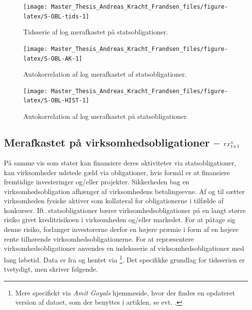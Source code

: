 \documentclass[
  a4paper,
  oneside]{memoir}
\begin{document}
\begin{figure}[htbp!]

{\centering \texttt{[image: Master\_Thesis\_Andreas\_Kracht\_Frandsen\_files/figure-latex/S-OBL-tids-1]} 

}

\caption{Tidsserie af log merafkastet på statsobligationer.}\label{fig:S-OBL-tids}
\end{figure}

\begin{figure}[htbp!]

{\centering \texttt{[image: Master\_Thesis\_Andreas\_Kracht\_Frandsen\_files/figure-latex/S-OBL-AK-1]} 

}

\caption{Autokorrelation af log merafkastet af statsobligationer.}\label{fig:S-OBL-AK}
\end{figure}

\begin{figure}[htbp!]

{\centering \texttt{[image: Master\_Thesis\_Andreas\_Kracht\_Frandsen\_files/figure-latex/S-OBL-HIST-1]} 

}

\caption{Autokorrelation af log merafkastet på statsobligationer.}\label{fig:S-OBL-HIST}
\end{figure}

\hypertarget{merafkastet-puxe5-virksomhedsobligationer-rx_t1textnormalv}{%
\subsection{\texorpdfstring{Merafkastet på virksomhedsobligationer -- \(rx_{t+1}^{\textnormal{v}}\)}{Merafkastet på virksomhedsobligationer -- rx\_\{t+1\}\^{}\{\textbackslash textnormal\{v\}\}}}\label{merafkastet-puxe5-virksomhedsobligationer-rx_t1textnormalv}}

På samme vis som stater kan finansiere deres aktiviteter via statsobligationer, kan virksomheder udstede gæld via obligationer, hvis formål er at finansiere fremtidige investeringer og/eller projekter. Sikkerheden bag en virksomhedsobligation afhænger af virksomhedens betalingsevne. Af og til sætter virksomheden fysiske aktiver som kollateral for obligationerne i tilfælde af konkurser. Ift. statsobligationer bærer virksomhedsobligationer på en langt større risiko givet kreditrisikoen i virksomheden og/eller markedet. For at påtage sig denne risiko, forlanger investorerne derfor en højere præmie i form af en højere rente tilhørende virksomhedsobligationerne. For at repræsentere virksomhedsobligationer anvendes en indeksserie af virksomhedsobligationer med lang løbetid. Data er fra \citep{Ibbotson2019} og hentet via \citep{Goyal2007}\footnote{Mere specifickt via \emph{Amit Goyals} hjemmeside, hvor der findes en opdateret version af dataet, som der benyttes i artiklen, se evt. \citep{Goyal2020}.}. Det specifikke grundlag for tidsserien er tvetydigt, men \citep{Ibbotson2019} skriver følgende.
\end{document}
